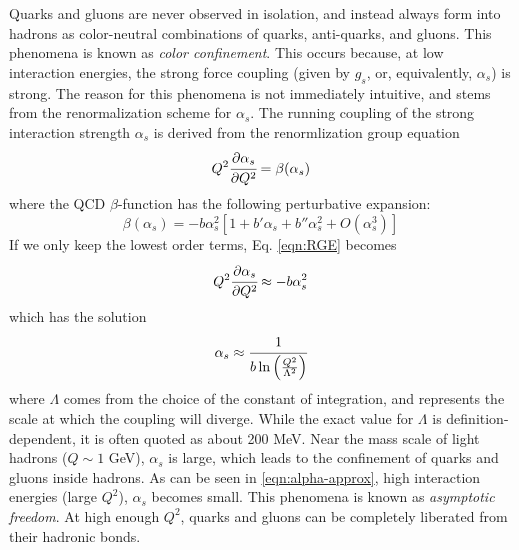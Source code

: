 

Quarks and gluons are never observed in isolation, and instead always form into hadrons as color-neutral combinations of quarks, anti-quarks, and gluons.
This phenomena is known as \textit{color confinement}.
This occurs because, at low interaction energies, the strong force coupling (given by $g_s$, or, equivalently, $\alpha_s$) is strong.
The reason for this phenomena is not immediately intuitive, and stems from the renormalization scheme for $\alpha_s$.
The running coupling of the strong interaction strength $\alpha_s$ is derived from the renormlization group equation
\begin{equation}
  \label{eqn:RGE}
  Q^2 \cfrac{\partial \alpha_s}{\partial Q^2} = \beta(\alpha_s)
\end{equation}
where the QCD $\beta$-function has the following perturbative expansion:
\begin{equation}
  \label{eqn:beta-function}
  \beta(\alpha_s) = -b \alpha_s^2 \left[1 + b'\alpha_s + b''\alpha_s^2  + O(\alpha_s^3)\right]
\end{equation}
If we only keep the lowest order terms, Eq. \ref{eqn:RGE} becomes
\begin{equation}
  \label{eqn:RGE-lowest-order}
  Q^2 \cfrac{\partial \alpha_s}{\partial Q^2} \approx -b \alpha_s^2
\end{equation}
which has the solution
\begin{equation}
  \label{eqn:alpha-approx}
  \alpha_s \approx \cfrac{1}{b\ln\left(\frac{Q^2}{\Lambda^2}\right)}
\end{equation}
where $\Lambda$ comes from the choice of the constant of integration, and represents the scale at which the coupling will diverge.
While the exact value for $\Lambda$ is definition-dependent, it is often quoted as about 200 MeV.
Near the mass scale of light hadrons ($Q \sim 1$ GeV), $\alpha_s$ is large, which leads to the confinement of quarks and gluons inside hadrons.
As can be seen in \ref{eqn:alpha-approx}, high interaction energies (large $Q^2$), $\alpha_s$ becomes small.
This phenomena is known as \textit{asymptotic freedom}.
At high enough $Q^2$, quarks and gluons can be completely liberated from their hadronic bonds.











